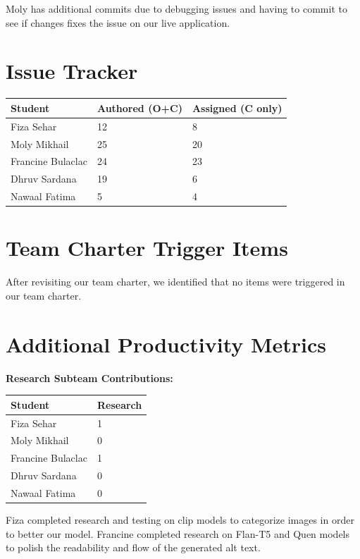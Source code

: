 \documentclass{article}
\begin{document}
Moly has additional commits due to debugging issues and having to commit to see if changes fixes the issue on our live
application.

\section{Issue Tracker}

\begin{table}[H]
\centering
\begin{tabular}{lll}
\toprule
\textbf{Student} & \textbf{Authored (O+C)} & \textbf{Assigned (C only)}\\
\midrule
Fiza Sehar & 12 & 8 \\
Moly Mikhail & 25 & 20 \\
Francine Bulaclac & 24 & 23 \\
Dhruv Sardana & 19 & 6 \\
Nawaal Fatima & 5 & 4 \\
\bottomrule
\end{tabular}
\end{table}

\section{Team Charter Trigger Items}

After revisiting our team charter, we identified that no items were triggered in our team charter. 
\section{Additional Productivity Metrics}
\textbf{Research Subteam Contributions:}
\begin{table}[H]
\centering
\begin{tabular}{ll}
\toprule
\textbf{Student} & \textbf{Research}\\
\midrule
Fiza Sehar & 1\\
Moly Mikhail & 0\\
Francine Bulaclac & 1\\
Dhruv Sardana & 0\\
Nawaal Fatima & 0\\
\bottomrule
\end{tabular}
\end{table}

Fiza completed research and testing on clip models to categorize images in order to better our model. 
Francine completed research on Flan-T5 and Quen models to polish the readability and flow of the generated alt text. \\
\end{document}
